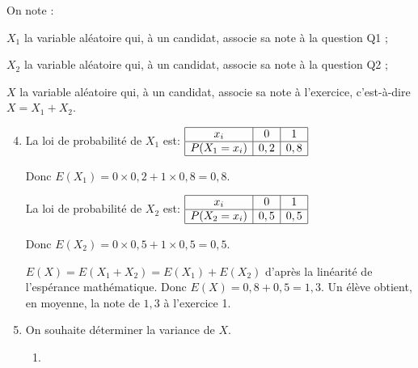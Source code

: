 \begin{list}{\textbullet}{On note :}
		\item $X_{1}$ la variable aléatoire qui, à un candidat, associe sa note à la question Q1 ;
		\item $X_{2}$ la variable aléatoire qui, à un candidat, associe sa note à la question Q2 ;
		\item $X$ la variable aléatoire qui, à un candidat, associe sa note à l'exercice, c'est-à-dire $X = X_{1} + X_{2}$.
\end{list}

\begin{enumerate}
\setcounter{enumi}{3}

\item La loi de probabilité de $X_1$ est:\hspace{2cm}
$\begin{array}{|c|c|c|}
\hline
x_i & 0 & 1\\
\hline
P(X_1=x_i) & 0,2 & 0,8\\
\hline
\end{array}$

Donc $E(X_1)= 0\times 0,2 + 1\times 0,8=0,8$.

La loi de probabilité de $X_2$ est:\hspace{2cm}
$\begin{array}{|c|c|c|}
\hline
x_i & 0 & 1\\
\hline
P(X_2=x_i) & 0,5 & 0,5\\
\hline
\end{array}$

Donc $E(X_2)= 0\times 0,5 + 1\times 0,5 =0,5$.

$E(X)=E(X_1+X_2)=E(X_1)+E(X_2)$ d'après la linéarité de l'espérance mathématique.
Donc $E(X)=0,8+0,5=1,3$. Un élève obtient, en moyenne, la note de $1,3$ à l'exercice 1.

\item On souhaite déterminer la variance de $X$.

	\begin{enumerate}
		\item 
{}


\end{enumerate}
\end{enumerate}
